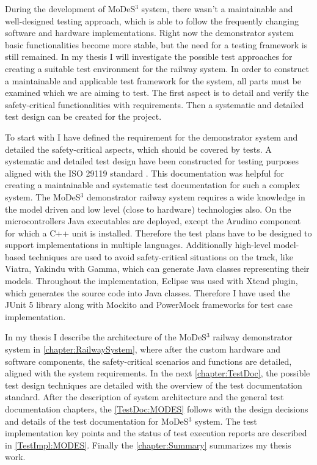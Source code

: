 During the development of MoDeS$^3$ system, there wasn't a maintainable and well-designed testing approach, which is able to follow the frequently changing software and hardware implementations. Right now the demonstrator system basic functionalities become more stable, but the need for a testing framework is still remained. In my thesis I will investigate the possible test approaches for creating a suitable test environment for the railway system. In order to construct a maintainable and applicable test framework for the system, all parts must be examined which we are aiming to test. The first aspect is to detail and verify the safety-critical functionalities with requirements. Then a systematic and detailed test design can be created for the project.

To start with I have defined the requirement for the demonstrator system and detailed the safety-critical aspects, which should be covered by tests. A systematic and detailed test design have been constructed for testing purposes aligned with the ISO 29119 standard \cite{IEEE13}. This documentation was helpful for creating a maintainable and systematic test documentation for such a complex system. The MoDeS$^3$ demonstrator railway system requires a wide knowledge in the model driven and low level (close to hardware) technologies also. On the microcontrollers Java executables are deployed, except the Arudino component for which a C++ unit is installed. Therefore the test plans have to be designed to support implementations in multiple languages. Additionally high-level model-based techniques are used to avoid safety-critical situations on the track, like Viatra, Yakindu with Gamma, which can generate Java classes representing their models. Throughout the implementation, Eclipse was used with Xtend plugin, which generates the source code into Java classes. Therefore I have used the JUnit 5 library along with Mockito and PowerMock frameworks for test case implementation.

In my thesis I describe the architecture of the MoDeS$^3$ railway demonstrator system in \autoref{chapter:RailwaySystem}, where after the custom hardware and software components, the safety-critical scenarios and functions are detailed, aligned with the system requirements. In the next \autoref{chapter:TestDoc}, the possible test design techniques are detailed with the overview of the test documentation standard. After the description of system architecture and the general test documentation chapters, the \autoref{TestDoc:MODES} follows with the design decisions and details of the test documentation for MoDeS$^3$ system. The test implementation key points and the status of test execution reports are described in \autoref{TestImpl:MODES}. Finally the \autoref{chapter:Summary} summarizes my thesis work.


